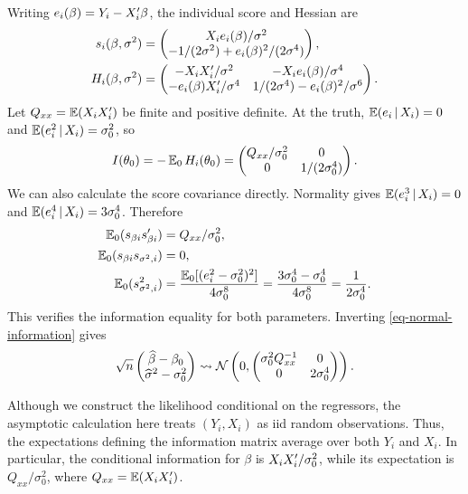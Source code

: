\documentclass[a4paper,12pt]{article}
\begin{document}
Writing $e_i(\beta)=Y_i-X_i^{\prime}\beta$, the individual score and Hessian are
\begin{align}
	s_i(\beta,\sigma^2)
	&=\begin{pmatrix}
		X_i e_i(\beta)/\sigma^2\\
		-1/(2\sigma^2)+e_i(\beta)^2/(2\sigma^4)
	\end{pmatrix},\\
	H_i(\beta,\sigma^2)
	&=\begin{pmatrix}
		-X_iX_i^{\prime}/\sigma^2 & -X_i e_i(\beta)/\sigma^4\\
		-e_i(\beta)X_i^{\prime}/\sigma^4 & 1/(2\sigma^4)-e_i(\beta)^2/\sigma^6
	\end{pmatrix}.
\end{align}
Let $Q_{xx}=\operatorname{\mathbb{E}}(X_iX_i^{\prime})$ be finite and positive definite.
At the truth, $\operatorname{\mathbb{E}}(e_i\mathpunct{}|\mathpunct{} X_i)=0$ and $\operatorname{\mathbb{E}}(e_i^2\mathpunct{}|\mathpunct{} X_i)=\sigma_0^2$, so
\begin{align}\label{eq-normal-information}
	I(\theta_0)=-\operatorname{\mathbb{E}}_0H_i(\theta_0)
	=\begin{pmatrix}
		Q_{xx}/\sigma_0^2&0\\
		0&1/(2\sigma_0^4)
	\end{pmatrix}.
\end{align}
We can also calculate the score covariance directly.
Normality gives $\operatorname{\mathbb{E}}(e_i^3\mathpunct{}|\mathpunct{} X_i)=0$ and $\operatorname{\mathbb{E}}(e_i^4\mathpunct{}|\mathpunct{} X_i)=3\sigma_0^4$.
Therefore
\begin{align*}
	\operatorname{\mathbb{E}}_0(s_{\beta i}s_{\beta i}^{\prime})&=Q_{xx}/\sigma_0^2,\\
	\operatorname{\mathbb{E}}_0(s_{\beta i}s_{\sigma^2,i})&=0,\\
	\operatorname{\mathbb{E}}_0(s_{\sigma^2,i}^2)&=\frac{\operatorname{\mathbb{E}}_0[(e_i^2-\sigma_0^2)^2]}{4\sigma_0^8}
	=\frac{3\sigma_0^4-\sigma_0^4}{4\sigma_0^8}=\frac1{2\sigma_0^4}.
\end{align*}
This verifies the information equality for both parameters.
Inverting \eqref{eq-normal-information} gives
\begin{align}
	\sqrt n\begin{pmatrix}\widehat\beta-\beta_0\\\widehat\sigma^2-\sigma_0^2\end{pmatrix}
	\overset{}{\leadsto}\operatorname{\mathcal{N}}\left(0,
	\begin{pmatrix}\sigma_0^2Q_{xx}^{-1}&0\\0&2\sigma_0^4\end{pmatrix}\right).
\end{align}

\begin{remark}
	Although we construct the likelihood conditional on the regressors,
	the asymptotic calculation here treats $(Y_i,X_i)$ as \gls{iid} random observations.
	Thus, the expectations defining the information matrix average over both $Y_i$ and $X_i$.
	In particular, the conditional information for $\beta$ is $X_iX_i^{\prime}/\sigma_0^2$,
	while its expectation is $Q_{xx}/\sigma_0^2$, where $Q_{xx}=\operatorname{\mathbb{E}}(X_iX_i^{\prime})$.
\end{remark}
\end{document}
